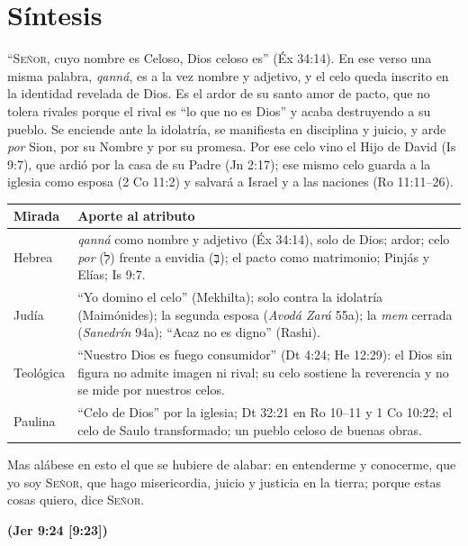 \documentclass[11pt,letterpaper]{article}
\newcommand{\heb}[1]{\mbox{\foreignlanguage{hebrew}{#1}}}
\newcommand{\SENOR}{\textsc{Señor}}
\newcommand{\fuente}[1]{\par\hfill{\upshape\bfseries\small\textcolor{azul}{#1}}}
\begin{document}
\section{Síntesis}

``\SENOR, cuyo nombre es Celoso, Dios celoso es'' (Éx 34:14). En ese verso una misma palabra, \emph{qanná}, es a la vez nombre y adjetivo, y el celo queda inscrito en la identidad revelada de Dios. Es el ardor de su santo amor de pacto, que no tolera rivales porque el rival es ``lo que no es Dios'' y acaba destruyendo a su pueblo. Se enciende ante la idolatría, se manifiesta en disciplina y juicio, y arde \emph{por} Sion, por su Nombre y por su promesa. Por ese celo vino el Hijo de David (Is 9:7), que ardió por la casa de su Padre (Jn 2:17); ese mismo celo guarda a la iglesia como esposa (2 Co 11:2) y salvará a Israel y a las naciones (Ro 11:11--26).

\begin{center}\small\renewcommand{\arraystretch}{1.18}
\begin{tabular}{@{}L{2.4cm}L{11.4cm}@{}}
\toprule
\textbf{Mirada} & \textbf{Aporte al atributo} \\ \midrule
Hebrea & \emph{qanná} como nombre y adjetivo (Éx 34:14), solo de Dios; ardor; celo \emph{por} (\heb{לְ}) frente a envidia (\heb{בְּ}); el pacto como matrimonio; Pinjás y Elías; Is 9:7. \\
Judía & ``Yo domino el celo'' (Mekhilta); solo contra la idolatría (Maimónides); la segunda esposa (\emph{Avodá Zará} 55a); la \emph{mem} cerrada (\emph{Sanedrín} 94a); ``Acaz no es digno'' (Rashi). \\
Teológica & ``Nuestro Dios es fuego consumidor'' (Dt 4:24; He 12:29): el Dios sin figura no admite imagen ni rival; su celo sostiene la reverencia y no se mide por nuestros celos. \\
Paulina & ``Celo de Dios'' por la iglesia; Dt 32:21 en Ro 10--11 y 1 Co 10:22; el celo de Saulo transformado; un pueblo celoso de buenas obras. \\
\bottomrule
\end{tabular}\end{center}

\begin{cita}Mas alábese en esto el que se hubiere de alabar: en entenderme y conocerme, que yo soy \SENOR, que hago misericordia, juicio y justicia en la tierra; porque estas cosas quiero, dice \SENOR.\fuente{(Jer 9:24 [9:23])}\end{cita}
\end{document}
